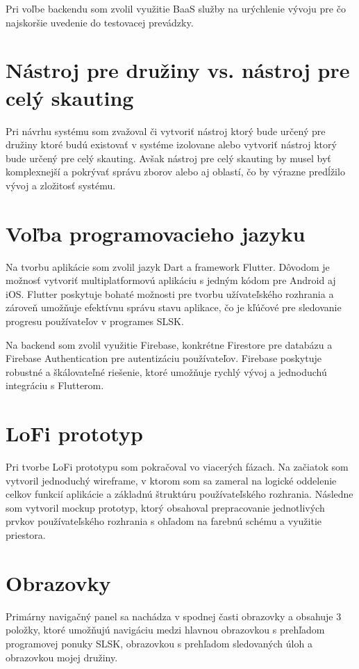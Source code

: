 Pri voľbe backendu som zvolil využitie BaaS služby na urýchlenie vývoju pre čo najskoršie uvedenie do testovacej prevádzky.

\section{Nástroj pre družiny vs. nástroj pre celý skauting}
Pri návrhu systému som zvažoval či vytvoriť nástroj ktorý bude určený pre družiny ktoré budú existovať v systéme izolovane alebo vytvoriť nástroj ktorý bude určený pre celý skauting. Avšak nástroj pre celý skauting by musel byť komplexnejší a pokrývať správu zborov alebo aj oblastí, čo by výrazne predĺžilo vývoj a zložitosť systému.

\section{Voľba programovacieho jazyku}
Na tvorbu aplikácie som zvolil jazyk Dart a framework Flutter. Dôvodom je možnosť vytvoriť multiplatformovú aplikáciu s jedným kódom pre Android aj iOS. Flutter poskytuje bohaté možnosti pre tvorbu užívateľského rozhrania a zároveň umožňuje efektívnu správu stavu aplikace, čo je kľúčové pre sledovanie progresu používateľov v programes SLSK.

Na backend som zvolil využitie Firebase, konkrétne Firestore pre databázu a Firebase Authentication pre autentizáciu používateľov. Firebase poskytuje robustné a škálovateľné riešenie, ktoré umožňuje rychlý vývoj a jednoduchú integráciu s Flutterom.

\section{LoFi prototyp}
Pri tvorbe LoFi prototypu som pokračoval vo viacerých fázach. Na začiatok som vytvoril jednoduchý wireframe, v ktorom som sa zameral na logické oddelenie celkov funkcií aplikácie a základnú štruktúru používateľského rozhrania. Následne som vytvoril mockup prototyp, ktorý obsahoval prepracovanie jednotlivých prvkov používateľského rozhrania s ohľadom na farebnú schému a využitie priestora.

\section{Obrazovky}
Primárny navigačný panel sa nachádza v spodnej časti obrazovky a obsahuje 3 položky, ktoré umožňujú navigáciu medzi hlavnou obrazovkou s prehľadom programovej ponuky SLSK, obrazovkou s prehľadom sledovaných úloh a obrazovkou mojej družiny.

